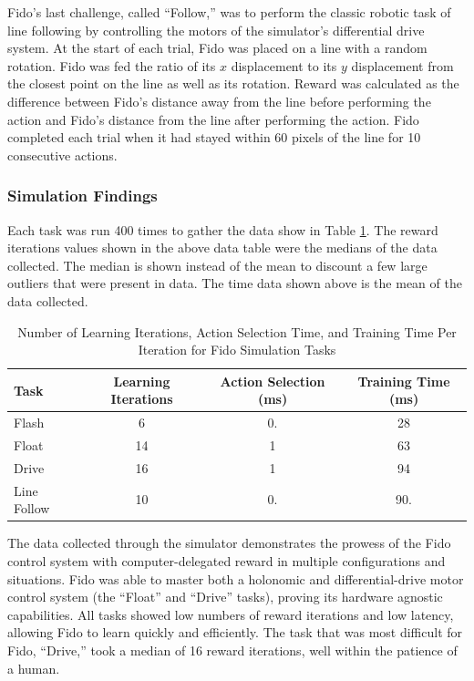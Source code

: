 Fido's last challenge, called ``Follow,'' was to perform the classic robotic task of line following by controlling the motors of the simulator's differential drive system.
At the start of each trial, Fido was placed on  a line with a random rotation.
Fido was fed the ratio of its $x$ displacement to its $y$ displacement from the closest point on the line as well as its rotation.
Reward was calculated as the difference between Fido's distance away from the line before performing the action and Fido's distance from the line after performing the action.
Fido completed each trial when it had stayed within 60 pixels of the line for 10 consecutive actions.

\subsubsection{Simulation Findings}

Each task was run 400 times to gather the data show in Table \ref{tab:data}.
The reward iterations values shown in the above data table were the medians of the data collected.
The median is shown instead of the mean to discount a few large outliers that were present in data.
The time data shown above is the mean of the data collected.

\begin{table}[ht]
	\centering
	\begin{tabular}{@{}lccc@{}}
		\toprule
		Task        & Learning Iterations & Action Selection (ms) & Training Time (ms) \\ \midrule
		Flash       & 6                   & 0.                 & 28               \\
		Float       & 14                  & 1                  & 63              \\
		Drive       & 16                  & 1                  & 94             \\
		Line Follow & 10                  & 0.                  & 90.
             \\ \bottomrule
	\end{tabular}
	\caption{Number of Learning Iterations, Action Selection Time, and Training Time Per Iteration for Fido Simulation Tasks}
	\label{tab:data}
\end{table}

The data collected through the simulator demonstrates the prowess of the Fido control system with computer-delegated reward in multiple configurations and situations.
 Fido was able to master both a holonomic and differential-drive motor control system (the ``Float'' and ``Drive'' tasks), proving its hardware agnostic capabilities.
All tasks showed low numbers of reward iterations and low latency, allowing Fido to learn quickly and efficiently.
The task that was most difficult for Fido, ``Drive,'' took a median of 16 reward iterations, well within the patience of a human.

